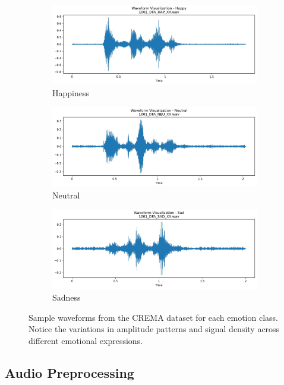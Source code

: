 \begin{figure}[h]
    \begin{subfigure}[b]{0.32\textwidth}
        \includegraphics[width=\textwidth]{images/happy.jpeg}
        \caption{Happiness}
    \end{subfigure}
    \begin{subfigure}[b]{0.32\textwidth}
        \includegraphics[width=\textwidth]{images/neutral.jpeg}
        \caption{Neutral}
    \end{subfigure}
    \begin{subfigure}[b]{0.32\textwidth}
        \includegraphics[width=\textwidth]{images/sad.jpeg}
        \caption{Sadness}
    \end{subfigure}
    \caption{Sample waveforms from the CREMA dataset for each emotion class. Notice the variations in amplitude patterns and signal density across different emotional expressions.}
    \label{fig:waveforms}
\end{figure}

\subsection{Audio Preprocessing}


